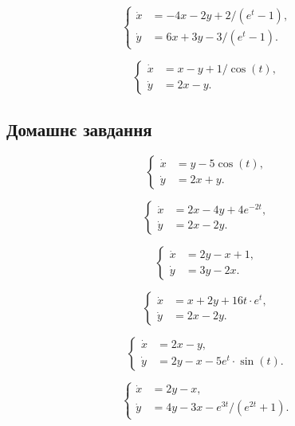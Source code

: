 \begin{problem}
	\[ \left\{ \begin{aligned} \dot x &= - 4 x - 2 y + 2 / (e^t - 1), \\ \dot y &= 6 x + 3 y - 3 / (e^t - 1). \end{aligned} \right. \]
\end{problem}

\begin{problem}
	\[ \left\{ \begin{aligned} \dot x &= x - y + 1 / \cos (t), \\ \dot y &= 2 x - y. \end{aligned} \right. \]
\end{problem}

\subsection*{Домашнє завдання}

\begin{problem}
	\[ \left\{ \begin{aligned} \dot x &= y - 5 \cos (t), \\ \dot y &= 2 x + y. \end{aligned} \right. \]
\end{problem}

\begin{problem}
	\[ \left\{ \begin{aligned} \dot x &= 2 x - 4 y + 4 e^{-2t}, \\ \dot y &= 2 x - 2 y. \end{aligned} \right. \]
\end{problem}

\begin{problem}
	\[ \left\{ \begin{aligned} \dot x &= 2 y - x + 1, \\ \dot y &= 3 y - 2x. \end{aligned} \right. \]
\end{problem}

\begin{problem}
	\[ \left\{ \begin{aligned} \dot x &= x + 2 y + 16 t \cdot e^t, \\ \dot y &= 2 x - 2 y. \end{aligned} \right. \]
\end{problem}

\begin{problem}
	\[ \left\{ \begin{aligned} \dot x &= 2 x - y, \\ \dot y &= 2 y - x - 5 e^t \cdot \sin (t). \end{aligned} \right. \]
\end{problem}

\begin{problem}
	\[ \left\{ \begin{aligned} \dot x &= 2 y - x, \\ \dot y &= 4 y - 3 x - e^{3 t} / (e^{2 t} + 1). \end{aligned} \right. \]
\end{problem}
